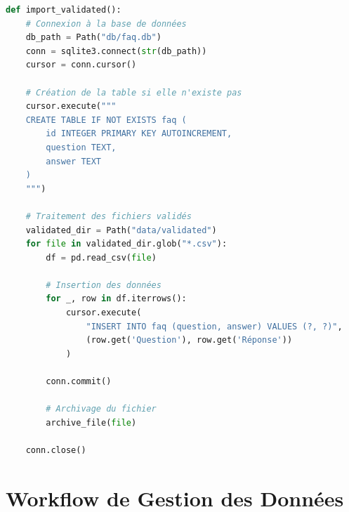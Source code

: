 \documentclass[11pt,a4paper]{article}
\begin{document}
\begin{lstlisting}[language=Python, caption=import\_validated.py - Structure]
def import_validated():
    # Connexion à la base de données
    db_path = Path("db/faq.db")
    conn = sqlite3.connect(str(db_path))
    cursor = conn.cursor()
    
    # Création de la table si elle n'existe pas
    cursor.execute("""
    CREATE TABLE IF NOT EXISTS faq (
        id INTEGER PRIMARY KEY AUTOINCREMENT,
        question TEXT,
        answer TEXT
    )
    """)
    
    # Traitement des fichiers validés
    validated_dir = Path("data/validated")
    for file in validated_dir.glob("*.csv"):
        df = pd.read_csv(file)
        
        # Insertion des données
        for _, row in df.iterrows():
            cursor.execute(
                "INSERT INTO faq (question, answer) VALUES (?, ?)",
                (row.get('Question'), row.get('Réponse'))
            )
        
        conn.commit()
        
        # Archivage du fichier
        archive_file(file)
    
    conn.close()
\end{lstlisting}

\section{Workflow de Gestion des Données}
\label{sec:data-workflow}
\end{document}
